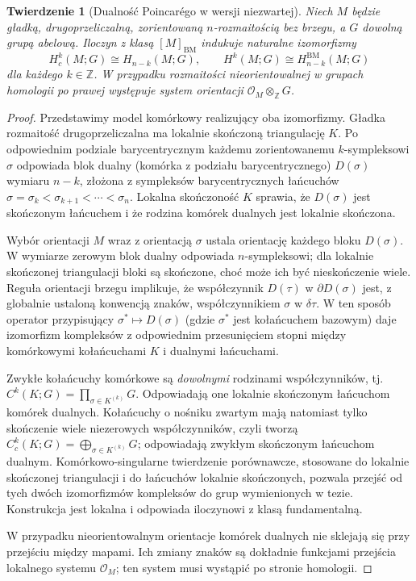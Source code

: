 \documentclass[11pt,a4paper,oneside]{report}
\newcommand{\Z}{\mathbb{Z}}
\theoremstyle{plain}
\newtheorem{twierdzenie}{Twierdzenie}[section]
\theoremstyle{definition}
\theoremstyle{remark}
\begin{document}
\begin{twierdzenie}[Dualność Poincarégo w wersji niezwartej]
\label{thm:noncompact-PD-v11}
Niech $M$ będzie gładką, drugoprzeliczalną,
zorientowaną $n$-rozmaitością bez brzegu,
a $G$ dowolną grupą abelową. Iloczyn z klasą
$[M]_{\mathrm{BM}}$ indukuje naturalne izomorfizmy
\[
H_c^k(M;G)\cong H_{n-k}(M;G),\qquad
H^k(M;G)\cong H_{n-k}^{\mathrm{BM}}(M;G)
\]
dla każdego $k\in\Z$. W przypadku rozmaitości
nieorientowalnej w grupach homologii po prawej
występuje system orientacji $\mathcal O_M\otimes_{\Z}G$.
\end{twierdzenie}
\begin{proof}
Przedstawimy model komórkowy realizujący oba izomorfizmy.
Gładka rozmaitość drugoprzeliczalna ma lokalnie skończoną
triangulację $K$. Po odpowiednim podziale barycentrycznym
każdemu zorientowanemu $k$-sympleksowi $\sigma$ odpowiada
blok dualny (komórka z podziału barycentrycznego) $D(\sigma)$ wymiaru $n-k$, złożona z
sympleksów barycentrycznych łańcuchów
$\sigma=\sigma_k<\sigma_{k+1}<\cdots<\sigma_n$.
Lokalna skończoność $K$ sprawia, że $D(\sigma)$ jest
skończonym łańcuchem i że rodzina komórek dualnych
jest lokalnie skończona.

Wybór orientacji $M$ wraz z orientacją $\sigma$
ustala orientację każdego bloku $D(\sigma)$.
W wymiarze zerowym blok dualny odpowiada
$n$-sympleksowi; dla lokalnie skończonej triangulacji
bloki są skończone, choć może ich być nieskończenie wiele.
Reguła orientacji brzegu implikuje,
że współczynnik $D(\tau)$ w $\partial D(\sigma)$
jest, z globalnie ustaloną konwencją znaków,
współczynnikiem $\sigma$ w $\delta\tau$.
W ten sposób operator przypisujący
$\sigma^*\mapsto D(\sigma)$ (gdzie $\sigma^*$ jest
kołańcuchem bazowym) daje izomorfizm kompleksów
z odpowiednim przesunięciem stopni między
komórkowymi kołańcuchami $K$ i dualnymi łańcuchami.

Zwykłe kołańcuchy komórkowe są \emph{dowolnymi}
rodzinami współczynników, tj.
$C^k(K;G)=\prod_{\sigma\in K^{(k)}}G$.
Odpowiadają one lokalnie skończonym łańcuchom
komórek dualnych. Kołańcuchy o nośniku zwartym
mają natomiast tylko skończenie wiele niezerowych
współczynników, czyli tworzą
$C_c^k(K;G)=\bigoplus_{\sigma\in K^{(k)}}G$;
odpowiadają zwykłym skończonym łańcuchom dualnym.
Komórkowo-singularne twierdzenie porównawcze,
stosowane do lokalnie skończonej triangulacji
i do łańcuchów lokalnie skończonych, pozwala
przejść od tych dwóch izomorfizmów kompleksów
do grup wymienionych w tezie. Konstrukcja jest
lokalna i odpowiada iloczynowi z klasą fundamentalną.

W przypadku nieorientowalnym orientacje komórek dualnych
nie sklejają się przy przejściu między mapami.
Ich zmiany znaków są dokładnie funkcjami przejścia
lokalnego systemu $\mathcal O_M$; ten system
musi wystąpić po stronie homologii.
\end{proof}
\end{document}
